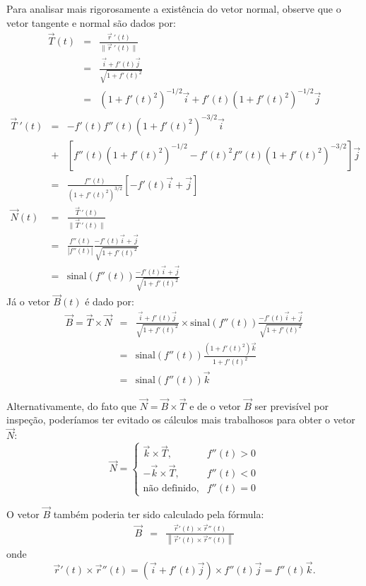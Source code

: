 \begin{resol}
Para analisar mais rigorosamente a existência do vetor normal, observe que o vetor tangente e normal são dados por:
\begin{eqnarray*}
 \vec{T}(t)&=&\frac{\vec{r}~\!'(t)}{\|\vec{r}~\!'(t)\|}\\
 &=&\frac{\vec{i}+f'(t)\vec{j}}{\sqrt{1+f'(t)^2}}\\
 &=&\left(1+f'(t)^2\right)^{-1/2}\vec{i}+f'(t)\left(1+f'(t)^2\right)^{-1/2}\vec{j}
\end{eqnarray*}
\begin{eqnarray*}
 \vec{T}~\!'(t)
 &=&-f'(t)f''(t)\left(1+f'(t)^2\right)^{-3/2}\vec{i}\\
 &+&\left[f''(t)\left(1+f'(t)^2\right)^{-1/2}-f'(t)^2f''(t)\left(1+f'(t)^2\right)^{-3/2}\right]\vec{j}\\
 &=&\frac{f''(t)}{\left(1+f'(t)^2\right)^{3/2}}\left[-f'(t)\vec{i}+\vec{j}\right]\\
\vec{N}(t)&=&\frac{\vec{T}~\!'(t)}{\|\vec{T}~\!'(t)\|}\\
&=&\frac{f''(t)}{|f''(t)|}\frac{-f'(t)\vec{i}+\vec{j}}{\sqrt{1+f'(t)^2}}\\
&=&\text{sinal}\left(f''(t)\right)\frac{-f'(t)\vec{i}+\vec{j}}{\sqrt{1+f'(t)^2}}
\end{eqnarray*}
Já o vetor $\vec{B}(t)$ é dado por:
\begin{eqnarray*}
\vec{B}=\vec{T}\times \vec{N} &=& \frac{\vec{i}+f'(t)\vec{j}}{\sqrt{1+f'(t)^2}} \times \text{sinal}\left(f''(t)\right)\frac{-f'(t)\vec{i}+\vec{j}}{\sqrt{1+f'(t)^2}}\\
&=&\text{sinal}(f''(t))\frac{(1+f'(t)^2)\vec{k}}{1+f'(t)^2}\\
&=&\text{sinal}(f''(t))\vec{k}
\end{eqnarray*}

Alternativamente, do fato que $\vec{N}=\vec{B}\times \vec{T}$ e de o vetor $\vec{B}$ ser previsível por inspeção, poderíamos ter evitado os cálculos mais trabalhosos para obter o vetor $\vec{N}$:
$$\vec{N}=\left\{
\begin{array}{rr}
\vec{k}\times\vec{T},&f''(t)>0\\
-\vec{k}\times\vec{T},&f''(t)<0\\
\text{não definido},&f''(t)=0
\end{array}
\right.$$

O vetor $\vec{B}$ também poderia ter sido calculado pela fórmula:
 \begin{eqnarray*}
  \vec{B}&=&\frac{\vec{r}'(t)\times \vec{r}''(t)}{\left\|\vec{r}'(t)\times \vec{r}''(t)\right\|}
 \end{eqnarray*}
onde $$\vec{r}'(t)\times \vec{r}''(t)=\left(\vec{i}+f'(t)\vec{j}\right)\times f''(t)\vec{j}=f''(t)\vec{k}.$$

\end{resol}


